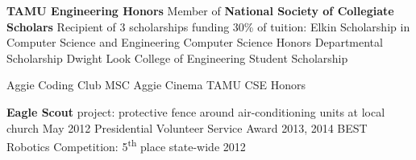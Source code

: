 \documentclass[12pt]{article}
\begin{document}
\begin{flushleft}
\begin{outline}[compactitem]
  \1 \textbf{TAMU Engineering Honors}
  \1 Member of \textbf{National Society of Collegiate Scholars}
  \1 Recipient of 3 scholarships funding 30\% of tuition:
    \2 Elkin Scholarship in Computer Science and Engineering
    \2 Computer Science Honors Departmental Scholarship
    \2 Dwight Look College of Engineering Student Scholarship

  \1 
    Aggie Coding Club
    \hfill{}\hspace{1px}
    MSC Aggie Cinema
    \hfill{}\hspace{1px}
    TAMU CSE Honors

  \1 \textbf{Eagle Scout} project: protective fence around air-conditioning units at local church \hfill May 2012
  \1 Presidential Volunteer Service Award \hfill 2013, 2014
  \1 BEST Robotics Competition: 5\textsuperscript{th} place state-wide \hfill 2012 \hfill

\end{outline}
\end{flushleft}
\end{document}

